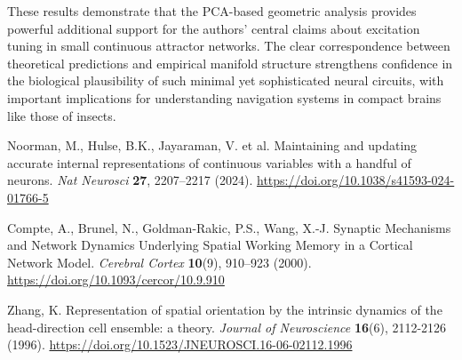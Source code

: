 \documentclass[11pt,a4paper]{article}
\begin{document}
These results demonstrate that the PCA-based geometric analysis provides powerful additional support for the authors' central claims about excitation tuning in small continuous attractor networks. The clear correspondence between theoretical predictions and empirical manifold structure strengthens confidence in the biological plausibility of such minimal yet sophisticated neural circuits, with important implications for understanding navigation systems in compact brains like those of insects.


\begin{thebibliography}{9}

Noorman, M., Hulse, B.K., Jayaraman, V. et al. 
Maintaining and updating accurate internal representations of continuous variables with a handful of neurons. 
\textit{Nat Neurosci} \textbf{27}, 2207–2217 (2024). 
\url{https://doi.org/10.1038/s41593-024-01766-5}

Compte, A., Brunel, N., Goldman-Rakic, P.S., Wang, X.-J.
Synaptic Mechanisms and Network Dynamics Underlying Spatial Working Memory in a Cortical Network Model.
\textit{Cerebral Cortex} \textbf{10}(9), 910–923 (2000).
\url{https://doi.org/10.1093/cercor/10.9.910}

Zhang, K.
Representation of spatial orientation by the intrinsic dynamics of the head-direction cell ensemble: a theory.
\textit{Journal of Neuroscience} \textbf{16}(6), 2112-2126 (1996).
\url{https://doi.org/10.1523/JNEUROSCI.16-06-02112.1996}

\end{thebibliography}
\end{document}

